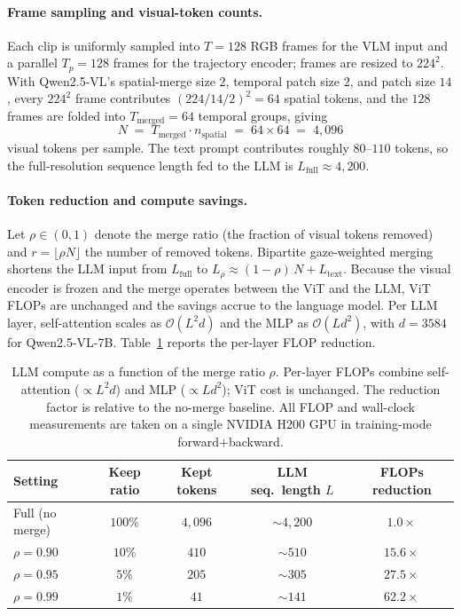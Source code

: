 \paragraph{Frame sampling and visual-token counts.}
Each clip is uniformly sampled into $T{=}128$ RGB frames for the VLM input
and a parallel $T_p{=}128$ frames for the trajectory encoder; frames are
resized to $224^2$. With Qwen2.5-VL's spatial-merge size $2$, temporal
patch size $2$, and patch size $14$, every $224^2$ frame contributes
$(224/14/2)^2{=}64$ spatial tokens, and the $128$ frames are folded into
$T_\text{merged}{=}64$ temporal groups, giving
\begin{equation}
    N \;=\; T_\text{merged}\cdot n_\text{spatial}
         \;=\; 64 \times 64 \;=\; 4{,}096
    \label{eq:n_video}
\end{equation}
visual tokens per sample. The text prompt contributes roughly $80$--$110$
tokens, so the full-resolution sequence length fed to the LLM is
$L_\text{full}\approx 4{,}200$.

\paragraph{Token reduction and compute savings.}
Let $\rho \in (0,1)$ denote the merge ratio (the fraction of visual tokens
removed) and $r{=}\lfloor \rho N \rfloor$ the number of removed tokens.
Bipartite gaze-weighted merging shortens the LLM input from $L_\text{full}$
to $L_\rho \approx (1-\rho)\,N + L_\text{text}$. Because the visual encoder
is frozen and the merge operates between the ViT and the LLM, ViT FLOPs are
unchanged and the savings accrue to the language model. Per LLM layer,
self-attention scales as $\mathcal{O}(L^2 d)$ and the MLP as
$\mathcal{O}(L d^2)$, with $d{=}3584$ for Qwen2.5-VL-7B.
Table~\ref{tab:compute} reports the per-layer FLOP reduction.

\begin{table}[t]
  \centering
  \small
  \caption{LLM compute as a function of the merge ratio $\rho$. Per-layer
  FLOPs combine self-attention ($\propto L^2 d$) and MLP
  ($\propto L d^2$); ViT cost is unchanged. The reduction factor is
  relative to the no-merge baseline. All FLOP and wall-clock measurements
  are taken on a single NVIDIA H200 GPU in training-mode
  forward$+$backward.}
  \label{tab:compute}
  \begin{tabular}{lcccc}
    \toprule
    Setting & Keep ratio & Kept tokens & LLM seq.\ length $L$
            & FLOPs reduction \\
    \midrule
    Full (no merge) & $100\%$  & $4{,}096$ & ${\sim}4{,}200$ & $1.0\times$  \\
    $\rho = 0.90$   & $10\%$   & $410$     & ${\sim}510$     & $15.6\times$ \\
    $\rho = 0.95$   & $5\%$    & $205$     & ${\sim}305$     & $27.5\times$ \\
    $\rho = 0.99$   & $1\%$    & $41$      & ${\sim}141$     & $62.2\times$ \\
    \bottomrule
  \end{tabular}
\end{table}

